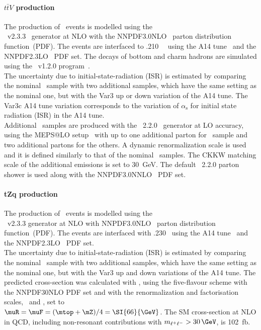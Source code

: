 \paragraph{$t\bar{t}V$ production} 
The production of \ttV\ events is modelled using the\\
\mgamc~v2.3.3~\cite{Alwall:2014hca} generator at NLO with the
\textsc{NNPDF3.0NLO}~\cite{Ball:2014uwa} parton distribution function~(PDF).
The events are interfaced to \pythia.210~\cite{Sjostrand:2014zea}~
using the A14 tune~\cite{ATL-PHYS-PUB-2014-021} and the
\textsc{NNPDF2.3LO}~\cite{Ball:2014uwa} PDF set. The decays of bottom and charm
hadrons are simulated using the \evtgen\ v1.2.0 program~\cite{EvtGen}.\\
The uncertainty due to initial-state-radiation (ISR) is estimated by
comparing the nominal \ttV\ sample with two additional samples, which
have the same setting as the nominal one, but with the Var3 up or down
variation of the A14 tune.  The Var3c A14 tune variation corresponds
to the variation of $\alpha_{\textrm{s}}$ for initial state radiation
(ISR) in the A14 tune.\\
Additional \ttV\ samples are produced with the
\sherpa~2.2.0~\cite{Bothmann:2019yzt} generator at LO accuracy, using
the MEPS@LO setup~\cite{Catani:2001cc,Hoeche:2009rj} with up to one
additional parton for \ttll\ sample and two additional partons for the
others. A dynamic renormalization scale is used and it is defined
similarly to that of the nominal \ttV\ samples. The CKKW matching
scale of the additional emissions is set to 30~GeV. The default
\sherpa~2.2.0 parton shower is used along with the
\textsc{NNPDF3.0NNLO}~\cite{Ball:2014uwa} PDF set.

\paragraph{tZq production}
The production of \tZq\ events is modelled using the\\ \mgamc~v2.3.3 \cite{Alwall:2014hca}
generator at NLO with \textsc{NNPDF3.0NLO}~\cite{Ball:2014uwa} parton distribution function~(PDF).
The events are interfaced with \pythia.230~\cite{Sjostrand:2014zea} using the A14 tune~\cite{ATL-PHYS-PUB-2014-021} and the \textsc{NNPDF2.3LO}~\cite{Ball:2014uwa} PDF set.\\
The uncertainty due to initial-state-radiation (ISR) is estimated by comparing the nominal \tZq\ sample with two additional samples,
which have the same setting as the nominal one, but with the Var3 up and down variations of the A14 tune. 
The predicted cross-section was calculated with , using the five-flavour scheme with the \textsc{NNPDF30NLO} PDF set and with the renormalization and factorisation scales, \muR\ and \muF, set to\\ \mbox{$\muR = \muF = (\mtop + \mZ)/4 = \SI{66}{\GeV}$.} The SM \tZq cross-section at NLO in QCD, including non-resonant contributions with $m_{\ell^+\ell^-} > 30\,\GeV$, is \SI{102}{fb}.


